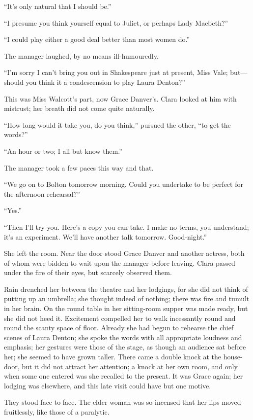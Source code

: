 ``It's only natural that I should be.''

``I presume you think yourself equal to Juliet, or perhaps Lady
Macbeth?''

``I could play either a good deal better than most women do.''

The manager laughed, by no means ill-humouredly.

``I'm sorry I can't bring you out in Shakespeare just at present, Miss
Vale; but---should you think it a condescension to play Laura Denton?''

{}This was Miss Walcott's part, now Grace Danver's. Clara looked at him
with mistrust; her breath did not come quite naturally.

``How long would it take you, do you think,'' pursued the other, ``to
get the words?''

``An hour or two; I all but know them.''

The manager took a few paces this way and that.

``We go on to Bolton tomorrow morning. Could you undertake to be perfect
for the afternoon rehearsal?''

``Yes.''

``Then I'll try you. Here's a copy you can take. I make no terms, you
understand; it's an experiment. We'll have another talk tomorrow.
Good-night.''

She left the room. Near the door stood Grace Danver and another actress,
both of whom were bidden to wait upon the manager before leaving. Clara
passed under the fire of their eyes, but scarcely observed them.

Rain drenched her between the theatre and her lodgings, for she did not
think of putting up an umbrella; she thought indeed of {}nothing; there
was fire and tumult in her brain. On the round table in her sitting-room
supper was made ready, but she did not heed it. Excitement compelled her
to walk incessantly round and round the scanty space of floor. Already
she had begun to rehearse the chief scenes of Laura Denton; she spoke
the words with all appropriate loudness and emphasis; her gestures were
those of the stage, as though an audience sat before her; she seemed to
have grown taller. There came a double knock at the house-door, but it
did not attract her attention; a knock at her own room, and only when
some one entered was she recalled to the present. It was Grace again;
her lodging was elsewhere, and this late visit could have but one
motive.

They stood face to face. The elder woman was so incensed that her lips
moved fruitlessly, like those of a paralytic.

